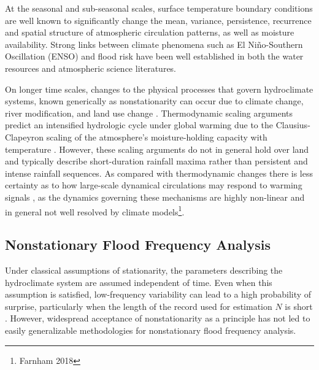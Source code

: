 \documentclass[12pt]{article}
\begin{document}
At the seasonal and sub-seasonal scales, surface temperature boundary conditions are well known to significantly change the mean, variance, persistence, recurrence and spatial structure of atmospheric circulation patterns, as well as moisture availability.
Strong links between climate phenomena such as El Ni\~no-Southern Oscillation (ENSO) and flood risk have been well established in both the water resources \citep[\ie{}][]{Ward2014} and atmospheric science \citep{Tedeschi2013} literatures.

On longer time scales, changes to the physical processes that govern hydroclimate systems, known generically as nonstationarity \citep{Milly2008} can occur due to climate change, river modification, and land use change \citep{Merz2014}.
Thermodynamic scaling arguments predict an intensified hydrologic cycle under global warming due to the Clausius-Clapeyron scaling of the atmosphere's moisture-holding capacity with temperature \citep[see][]{Muller2011,OGorman2015}.
However, these scaling arguments do not in general hold over land \citep{Byrne2015} and typically describe short-duration rainfall maxima rather than persistent and intense rainfall sequences.
As compared with thermodynamic changes there is less certainty as to how large-scale dynamical circulations may respond to warming signals \citep{Shaw2016,Barnes2015}, as the dynamics governing these mechanisms are highly non-linear \citep{Palmer2013} and in general not well resolved by climate models\footnote{Farnham 2018}.

\subsection{Nonstationary Flood Frequency Analysis}

Under classical assumptions of stationarity, the parameters describing the hydroclimate system are assumed independent of time.
Even when this assumption is satisfied, low-frequency variability can lead to a high probability of surprise, particularly when the length of the record used for estimation \(N\) is short \citep{Jain2001,Matalas2012}.
However, widespread acceptance of nonstationarity as a principle has not led to easily generalizable methodologies for nonstationary flood frequency analysis.
\end{document}
